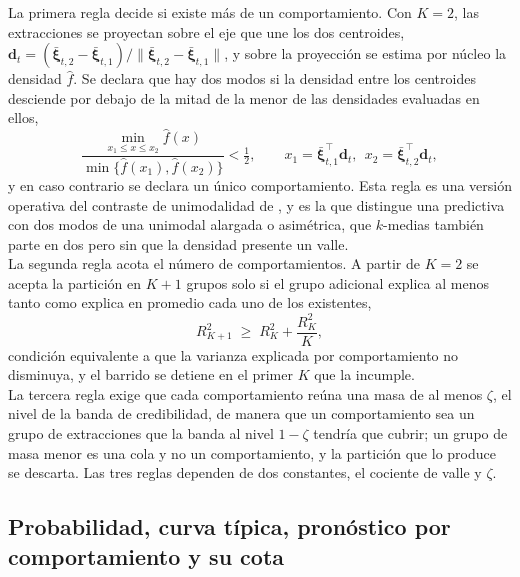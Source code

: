 La primera regla decide si existe más de un comportamiento. Con $K = 2$, las extracciones se proyectan sobre el eje que une los dos centroides, $\mathbf{d}_t = (\bar{\boldsymbol{\xi}}_{t,2} - \bar{\boldsymbol{\xi}}_{t,1}) / \lVert \bar{\boldsymbol{\xi}}_{t,2} - \bar{\boldsymbol{\xi}}_{t,1} \rVert$, y sobre la proyección se estima por núcleo la densidad $\widehat{f}$. Se declara que hay dos modos si la densidad entre los centroides desciende por debajo de la mitad de la menor de las densidades evaluadas en ellos,
\begin{equation}\label{eq:valle}
    \frac{\min_{x_1 \le x \le x_2} \widehat{f}(x)}{\min\bigl\{\widehat{f}(x_1), \widehat{f}(x_2)\bigr\}} < \tfrac{1}{2},
    \qquad x_1 = \bar{\boldsymbol{\xi}}_{t,1}^\top \mathbf{d}_t,\ \ x_2 = \bar{\boldsymbol{\xi}}_{t,2}^\top \mathbf{d}_t,
\end{equation}
y en caso contrario se declara un único comportamiento. Esta regla es una versión operativa del contraste de unimodalidad de \citet{03_05_hartigan1985dip}, y es la que distingue una predictiva con dos modos de una unimodal alargada o asimétrica, que $k$-medias también parte en dos pero sin que la densidad presente un valle.\\

La segunda regla acota el número de comportamientos. A partir de $K = 2$ se acepta la partición en $K + 1$ grupos solo si el grupo adicional explica al menos tanto como explica en promedio cada uno de los existentes,
\begin{equation}\label{eq:crecimiento}
    R^2_{K+1} \;\geq\; R^2_K + \frac{R^2_K}{K},
\end{equation}
condición equivalente a que la varianza explicada por comportamiento no disminuya, y el barrido se detiene en el primer $K$ que la incumple.\\

La tercera regla exige que cada comportamiento reúna una masa de al menos $\zeta$, el nivel de la banda de credibilidad, de manera que un comportamiento sea un grupo de extracciones que la banda al nivel $1-\zeta$ tendría que cubrir; un grupo de masa menor es una cola y no un comportamiento, y la partición que lo produce se descarta. Las tres reglas dependen de dos constantes, el cociente de valle y $\zeta$.

\subsection{Probabilidad, curva típica, pronóstico por comportamiento y su cota}
\label{03_06_03_descripcion}


